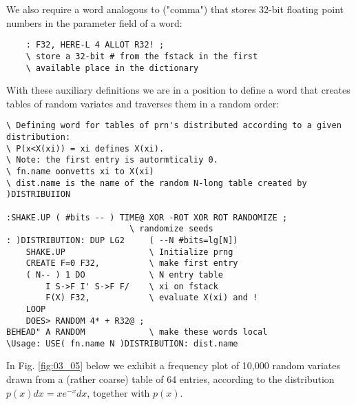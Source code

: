 We also require a word analogous to \bc{,} ("comma") that stores 32-bit floating point numbers in the parameter field of a word:

\begin{lstlisting}
    : F32, HERE-L 4 ALLOT R32! ;
    \ store a 32-bit # from the fstack in the first
    \ available place in the dictionary
\end{lstlisting}

With these auxiliary definitions we are in a position to define a word that creates tables of random variates and traverses them in a random order:

\begin{lstlisting}
\ Defining word for tables of prn's distributed according to a given distribution:
\ P(x<X(xi)) = xi defines X(xi).
\ Note: the first entry is autormticaliy 0.  
\ fn.name oonvetts xi to X(xi) 
\ dist.name is the name of the random N-long table created by )DISTRIBUIION

:SHAKE.UP ( #bits -- ) TIME@ XOR -ROT XOR ROT RANDOMIZE ;
                         \ randomize seeds
: )DISTRIBUTION: DUP LG2     ( --N #bits=lg[N])
    SHAKE.UP                 \ Initialize prng
    CREATE F=0 F32,          \ make first entry
    ( N-- ) 1 DO             \ N entry table
        I S->F I' S->F F/    \ xi on fstack
        F(X) F32,            \ evaluate X(xi) and !
    LOOP
    DOES> RANDOM 4* + R32@ ;
BEHEAD" A RANDOM             \ make these words local
\Usage: USE( fn.name N )DISTRIBUTION: dist.name
\end{lstlisting}

In Fig. \ref{fig:03_05} below we exhibit a frequency plot of 10,000 random variates drawn from a (rather coarse) table of 64 entries, according to the distribution $p(x)dx=xe^{-x}dx$, together with $p(x)$.

